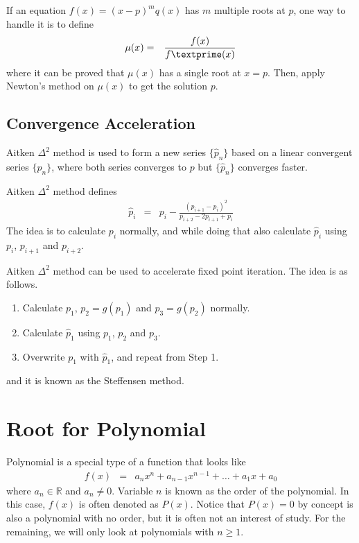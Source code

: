 If an equation $f(x)=(x-p)^mq(x)$ has $m$ multiple roots at $p$, one way to handle it is to define
\begin{eqnarray}
  \mu(x) &=& \frac{f(x)}{f\textprime (x)} \nonumber
\end{eqnarray}
where it can be proved that $\mu(x)$ has a single root at $x=p$. Then, apply Newton's method on $\mu(x)$ to get the solution $p$. 

\subsection{Convergence Acceleration}

Aitken $\Delta^2$ method is used to form a new series $\{\hat{p}_n\}$ based on a linear convergent series $\{p_n\}$, where both series converges to $p$ but $\{\hat{p}_n\}$ converges faster. 

Aitken $\Delta^2$ method defines
\begin{eqnarray}
  \hat{p}_i &=& p_i - \frac{(p_{i+1}-p_i)^2}{p_{i+2}-2p_{i+1}+p_i} \nonumber
\end{eqnarray}
The idea is to calculate $p_i$ normally, and while doing that also calculate $\hat{p}_i$ using $p_i$, $p_{i+1}$ and $p_{i+2}$.

Aitken $\Delta^2$ method can be used to accelerate fixed point iteration. The idea is as follows.
\begin{enumerate}
  \item Calculate $p_1$, $p_2=g(p_1)$ and $p_3=g(p_2)$ normally.
  \item Calculate $\hat{p}_1$ using $p_1$, $p_2$ and $p_3$.
  \item Overwrite $p_1$ with $\hat{p}_1$, and repeat from Step 1.
\end{enumerate}
and it is known as the Steffensen method.

\section{Root for Polynomial}

Polynomial is a special type of a function that looks like
\begin{eqnarray}
  f(x) &=& a_nx^n + a_{n-1}x^{n-1} + \ldots + a_1x + a_0 \nonumber
\end{eqnarray}
where $a_n \in \mathbb{R}$ and $a_n\neq 0$. Variable $n$ is known as the order of the polynomial. In this case, $f(x)$ is often denoted as $P(x)$. Notice that $P(x)=0$ by concept is also a polynomial with no order, but it is often not an interest of study. For the remaining, we will only look at polynomials with $n\geq 1$. 

